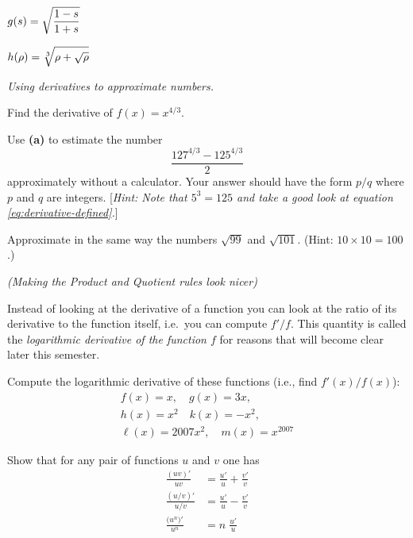 \begin{multicols}{2}
\problem $\displaystyle g(s) = \sqrt{\frac{1-s}{1+s}} $ 




\problem $\displaystyle h(\rho) = \sqrt[3]{\rho+\sqrt \rho}$ 












\problem \groupproblem\textit{Using derivatives to approximate numbers. } 




\subprob Find the derivative of $f(x) = x^{4/3}$.




\subprob Use \textbf{(a)} to estimate the number
\[
\frac{127^{4/3}-125^{4/3}}{2}
\]
approximately without a calculator. Your answer should have the form
$p/q$ where $p$ and $q$ are integers.  [\textsl{Hint: Note that
$5^3=125$ and take
a good look at equation \eqref{eq:derivative-defined}.}]




\subprob Approximate in the same way the numbers $\sqrt{99}$ and
$\sqrt{101}$. (Hint: $10\times 10=100$.)








\problem\label{ex:05log-derivs} 
\textit{(Making the Product and Quotient rules look nicer)}




Instead of looking at the derivative of a function you
can look at the ratio of its derivative to the function itself, i.e.\
you can compute $f'/f$.  This quantity is called the
\emph{logarithmic derivative of the function $f$} for reasons that
will become clear later this semester.


\subprob Compute the logarithmic derivative of these functions (i.e., find
$f'(x)/f(x)$):
\begin{gather*}
  f(x) = x ,\quad g(x) =3x ,\\
  h(x) =x^2 \quad k(x) =-x^2 ,\\
  \ell(x) =2007x^2,\quad m(x) =x^{2007}
\end{gather*}




\subprob Show that for any pair of functions $u$ and $v$ one has
\begin{align*}
  \frac{(uv)'}{uv} &= \frac{u'}{u} + \frac{v'}{v}\\
  \frac{(u/v)'}{u/v} &= \frac{u'}{u} - \frac{v'}{v}\\
  \frac{\bigl(u^n\bigr)'}{u^n} &= n\; \frac{u'}{u}
\end{align*}

















\end{multicols}
